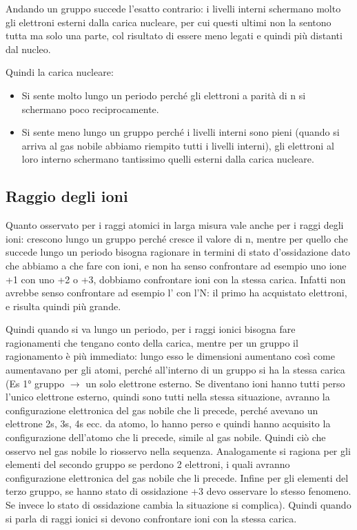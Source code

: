 Andando un gruppo succede l'esatto contrario: i livelli interni schermano molto gli elettroni esterni dalla carica nucleare, per cui questi ultimi non la sentono tutta ma solo una parte, col risultato di essere meno legati e quindi più distanti dal nucleo.

Quindi la carica nucleare:
\begin{itemize}
    \item Si sente molto lungo un periodo perché gli elettroni a parità di n si schermano poco reciprocamente.
    \item Si sente meno lungo un gruppo perché i livelli interni sono pieni (quando si arriva al gas nobile abbiamo riempito tutti i livelli interni), gli elettroni al loro interno schermano tantissimo quelli esterni dalla carica nucleare.
\end{itemize}
\subsection{Raggio degli ioni}
Quanto osservato per i raggi atomici in larga misura vale anche per i raggi degli ioni: crescono lungo un gruppo perché cresce il valore di n, mentre per quello che succede lungo un periodo bisogna ragionare in termini di stato d'ossidazione dato che abbiamo a che fare con ioni, e non ha senso confrontare ad esempio uno ione +1 con uno +2 o +3, dobbiamo confrontare ioni con la stessa carica. Infatti non avrebbe senso confrontare ad esempio l' con l'N: il primo ha acquistato elettroni, e risulta quindi più grande.

Quindi quando si va lungo un periodo, per i raggi ionici bisogna fare ragionamenti che tengano conto della carica, mentre per un gruppo il ragionamento è più immediato: lungo esso le dimensioni aumentano così come aumentavano per gli atomi, perché all'interno di un gruppo si ha la stessa carica (Es 1° gruppo $\rightarrow$ un solo elettrone esterno. Se diventano ioni hanno tutti perso l'unico elettrone esterno, quindi sono tutti nella stessa situazione, avranno la configurazione elettronica del gas nobile che li precede, perché avevano un elettrone 2s, 3s, 4s ecc. da atomo, lo hanno perso e quindi hanno acquisito la configurazione dell'atomo che li precede, simile al gas nobile. Quindi ciò che osservo nel gas nobile lo riosservo nella sequenza. Analogamente si ragiona per gli elementi del secondo gruppo se perdono 2 elettroni, i quali avranno configurazione elettronica del gas nobile che li precede. Infine per gli elementi del terzo gruppo, se hanno stato di ossidazione +3 devo osservare lo stesso fenomeno. Se invece lo stato di ossidazione cambia la situazione si complica). Quindi quando si parla di raggi ionici si devono confrontare ioni con la stessa carica.\\

